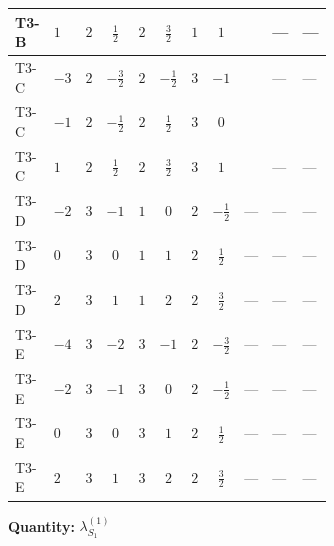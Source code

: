 \documentclass[8pt]{article}
\begin{document}
\begin{landscape}
\begin{longtable}{@{}llcccccc >{\raggedright\arraybackslash}p{0.21\linewidth} >{\raggedright\arraybackslash}p{0.21\linewidth} >{\raggedright\arraybackslash}p{0.21\linewidth}@{}}
\midrule
T3-B & $1$ & $2$ & $\frac{1}{2}$ & $2$ & $\frac{3}{2}$ & $1$ & $1$ & \scriptsize\adjustbox{max width=\linewidth}{$\begin{gathered} +\frac{{\lambda_{HS_1}^{(A)}}^2}{4}\end{gathered}$} & --- & --- \\
\midrule
T3-C & $-3$ & $2$ & $-\frac{3}{2}$ & $2$ & $-\frac{1}{2}$ & $3$ & $-1$ & \scriptsize\adjustbox{max width=\linewidth}{$\begin{gathered} +\frac{{\lambda_{HS_1}^{(A)}}^2}{4}\end{gathered}$} & --- & --- \\
\midrule
T3-C & $-1$ & $2$ & $-\frac{1}{2}$ & $2$ & $\frac{1}{2}$ & $3$ & $0$ & \scriptsize\adjustbox{max width=\linewidth}{$\begin{gathered} +\frac{{\lambda_{HS_1}^{(A)}}^2}{4}\end{gathered}$} & \scriptsize\adjustbox{max width=\linewidth}{$\begin{gathered} +8 {\lambda_{7}} \left({\lambda_{7}}\right)^{*}\end{gathered}$} & \scriptsize\adjustbox{max width=\linewidth}{$\begin{gathered} +8 {\lambda_{9}} \left({\lambda_{9}}\right)^{*}\end{gathered}$} \\
\midrule
T3-C & $1$ & $2$ & $\frac{1}{2}$ & $2$ & $\frac{3}{2}$ & $3$ & $1$ & \scriptsize\adjustbox{max width=\linewidth}{$\begin{gathered} +\frac{{\lambda_{HS_1}^{(A)}}^2}{4}\end{gathered}$} & --- & --- \\
\midrule
T3-D & $-2$ & $3$ & $-1$ & $1$ & $0$ & $2$ & $-\frac{1}{2}$ & --- & --- & --- \\
\midrule
T3-D & $0$ & $3$ & $0$ & $1$ & $1$ & $2$ & $\frac{1}{2}$ & --- & --- & --- \\
\midrule
T3-D & $2$ & $3$ & $1$ & $1$ & $2$ & $2$ & $\frac{3}{2}$ & --- & --- & --- \\
\midrule
T3-E & $-4$ & $3$ & $-2$ & $3$ & $-1$ & $2$ & $-\frac{3}{2}$ & --- & --- & --- \\
\midrule
T3-E & $-2$ & $3$ & $-1$ & $3$ & $0$ & $2$ & $-\frac{1}{2}$ & --- & --- & --- \\
\midrule
T3-E & $0$ & $3$ & $0$ & $3$ & $1$ & $2$ & $\frac{1}{2}$ & --- & --- & --- \\
\midrule
T3-E & $2$ & $3$ & $1$ & $3$ & $2$ & $2$ & $\frac{3}{2}$ & --- & --- & --- \\
\midrule
\bottomrule
\end{longtable}
\clearpage
\noindent\textbf{Quantity: }$\lambda_{S_1}^{(1)}$\par\smallskip

\end{landscape}
\end{document}
